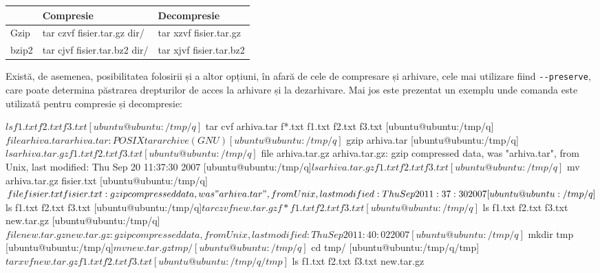 \begin{table}[htb]
\begin{center}
	\begin{tabular}{ p{} p{}  p{}}
	\toprule
	 & \textbf{Compresie} & \textbf{Decompresie} \\
	\midrule
		Gzip & tar czvf fisier.tar.gz dir/ & tar xzvf fisier.tar.gz \\
	\midrule
		bzip2 & tar cjvf fisier.tar.bz2 dir/ & tar xjvf fisier.tar.bz2 \\
	\bottomrule
	\end{tabular}
	\label{table:file-system-achivation-cmd}
\end{center}
\end{table}

Există, de asemenea, posibilitatea folosirii și a altor opțiuni, în afară de
cele de compresare și arhivare, cele mai utilizare fiind \texttt{-{}-preserve},
care poate determina păstrarea drepturilor de acces la arhivare și la
dezarhivare. Mai jos este prezentat un exemplu unde comanda  este
utilizată pentru compresie și decompresie:

\begin{screen}
$ ls
f1.txt  f2.txt  f3.txt
[ubuntu@ubuntu:/tmp/q]$ tar cvf arhiva.tar f*.txt
f1.txt
f2.txt
f3.txt
[ubuntu@ubuntu:/tmp/q]$ file arhiva.tar
arhiva.tar: POSIX tar archive (GNU)
[ubuntu@ubuntu:/tmp/q]$ gzip arhiva.tar
[ubuntu@ubuntu:/tmp/q]$ ls
arhiva.tar.gz  f1.txt  f2.txt  f3.txt
[ubuntu@ubuntu:/tmp/q]$ file arhiva.tar.gz
arhiva.tar.gz: gzip compressed data, was "arhiva.tar", from Unix, last modified: Thu Sep 20 11:37:30 2007
[ubuntu@ubuntu:/tmp/q]$ ls
arhiva.tar.gz  f1.txt  f2.txt  f3.txt
[ubuntu@ubuntu:/tmp/q]$ mv arhiva.tar.gz fisier.txt
[ubuntu@ubuntu:/tmp/q]$ file fisier.txt
fisier.txt: gzip compressed data, was "arhiva.tar", from Unix, last modified: Thu Sep 20 11:37:30 2007
[ubuntu@ubuntu:/tmp/q]$ ls
f1.txt  f2.txt  f3.txt
[ubuntu@ubuntu:/tmp/q]$ tar czvf new.tar.gz f*
f1.txt
f2.txt
f3.txt
[ubuntu@ubuntu:/tmp/q]$ ls
f1.txt  f2.txt  f3.txt  new.tar.gz
[ubuntu@ubuntu:/tmp/q]$ file new.tar.gz
new.tar.gz: gzip compressed data, from Unix, last modified: Thu Sep 20 11:40:02 2007
[ubuntu@ubuntu:/tmp/q]$ mkdir tmp
[ubuntu@ubuntu:/tmp/q]$ mv new.tar.gz tmp/
[ubuntu@ubuntu:/tmp/q]$ cd tmp/
[ubuntu@ubuntu:/tmp/q/tmp]$ tar xvf new.tar.gz
f1.txt
f2.txt
f3.txt
[ubuntu@ubuntu:/tmp/q/tmp]$ ls
f1.txt  f2.txt  f3.txt  new.tar.gz
\end{screen}

